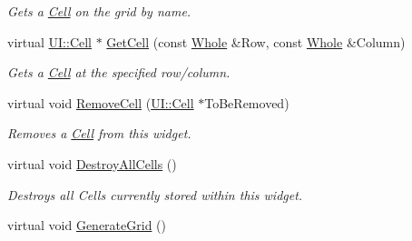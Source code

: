 \begin{DoxyCompactItemize}
\begin{DoxyCompactList}\small\item\em Gets a \hyperlink{classphys_1_1UI_1_1Cell}{Cell} on the grid by name. \item\end{DoxyCompactList}\item 
virtual \hyperlink{classphys_1_1UI_1_1Cell}{UI::Cell} $\ast$ \hyperlink{classphys_1_1UI_1_1CellGrid_a6a39785b673abb8cffc8bbd0b8837208}{GetCell} (const \hyperlink{namespacephys_a460f6bc24c8dd347b05e0366ae34f34a}{Whole} \&Row, const \hyperlink{namespacephys_a460f6bc24c8dd347b05e0366ae34f34a}{Whole} \&Column)
\begin{DoxyCompactList}\small\item\em Gets a \hyperlink{classphys_1_1UI_1_1Cell}{Cell} at the specified row/column. \item\end{DoxyCompactList}\item 
virtual void \hyperlink{classphys_1_1UI_1_1CellGrid_af7ff6b201aa24939c82ee34e96e67a32}{RemoveCell} (\hyperlink{classphys_1_1UI_1_1Cell}{UI::Cell} $\ast$ToBeRemoved)
\begin{DoxyCompactList}\small\item\em Removes a \hyperlink{classphys_1_1UI_1_1Cell}{Cell} from this widget. \item\end{DoxyCompactList}\item 
\hypertarget{classphys_1_1UI_1_1CellGrid_a12736adff3718820b4915cbe9961c66f}{
virtual void \hyperlink{classphys_1_1UI_1_1CellGrid_a12736adff3718820b4915cbe9961c66f}{DestroyAllCells} ()}
\label{d8/d59/classphys_1_1UI_1_1CellGrid_a12736adff3718820b4915cbe9961c66f}

\begin{DoxyCompactList}\small\item\em Destroys all Cells currently stored within this widget. \item\end{DoxyCompactList}\item 
\hypertarget{classphys_1_1UI_1_1CellGrid_a7a990cd514b6c02ea8f7747b0b058c93}{
virtual void \hyperlink{classphys_1_1UI_1_1CellGrid_a7a990cd514b6c02ea8f7747b0b058c93}{GenerateGrid} ()}
\label{d8/d59/classphys_1_1UI_1_1CellGrid_a7a990cd514b6c02ea8f7747b0b058c93}


\end{DoxyCompactItemize}
